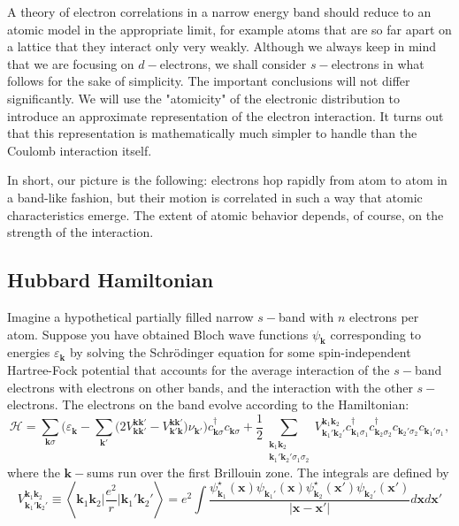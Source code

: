 A theory of electron correlations in a narrow energy band should reduce to an atomic model in the appropriate limit, for example atoms that are so far apart on a lattice that they interact only very weakly.
Although we always keep in mind that we are focusing on $d-$electrons, we shall consider $s-$electrons in what follows for the sake of simplicity.
The important conclusions will not differ significantly.
We will use the "atomicity" of the electronic distribution to introduce an approximate representation of the electron interaction.
It turns out that this representation is mathematically much simpler to handle than the Coulomb interaction itself.

In short, our picture is the following: electrons hop rapidly from atom to atom in a band-like fashion, but their motion is correlated in such a way that atomic characteristics emerge.
The extent of atomic behavior depends, of course, on the strength of the interaction.

\subsection{Hubbard Hamiltonian}\label{subsec:hubbardHamiltonian}

Imagine a hypothetical partially filled narrow $s-$band with $n$ electrons per atom.
Suppose you have obtained Bloch wave functions $\psi_{\bm k}$ corresponding to energies $\varepsilon_{\bm k}$ by solving the Schr\"odinger equation for some spin-independent Hartree-Fock potential that accounts for the average interaction of the $s-$band electrons with electrons on other bands, and the interaction with the other $s-$electrons.
The electrons on the band evolve according to the Hamiltonian:
\begin{equation}\label{eq:startingHamiltonian}
\mathcal{H} = \sum_{\bm k \sigma} \bigg( \varepsilon_{\bm k} - \sum_{ \bm k'} \big( 2 V^{\bm k \bm k'}_{\bm k \bm k'} - V^{\bm k \bm k'}_{\bm k' \bm k} \big) \nu_{\bm k'} \bigg) c_{\bm k \sigma}^\dagger c_{\bm k \sigma} +  \frac{1}{2} \sum_{ \substack{\bm k_1 \bm k_2 \\ \bm k_1' \bm k_2'  \sigma_1 \sigma_2 } } V^{\bm k_1 \bm k_2}_{\bm k_1' \bm k_2'}
 c_{\bm k_1 \sigma_1}^\dagger c_{\bm k_2 \sigma_2}^\dagger c_{\bm k_2' \sigma_2} c_{\bm k_1' \sigma_1} ,
\end{equation}
where the $\bm k-$sums run over the first Brillouin zone.
The integrals are defined by
\begin{equation}\label{eq:integrals}
V^{\bm k_1 \bm k_2}_{\bm k_1' \bm k_2'} \equiv \left\langle \bm k_1 \bm k_2 \bigg| \frac{e^2}{r} \bigg| \bm k_1' \bm k_2' \right\rangle  =  e^2 \int \frac{\psi_{\bm k_1}^\star (\bm x) \psi_{\bm k_1'} (\bm x) \psi_{\bm k_2}^\star (\bm x') \psi_{\bm k_2'}(\bm x') }{| \bm x - \bm x' |} d\bm x d\bm x'
\end{equation}

